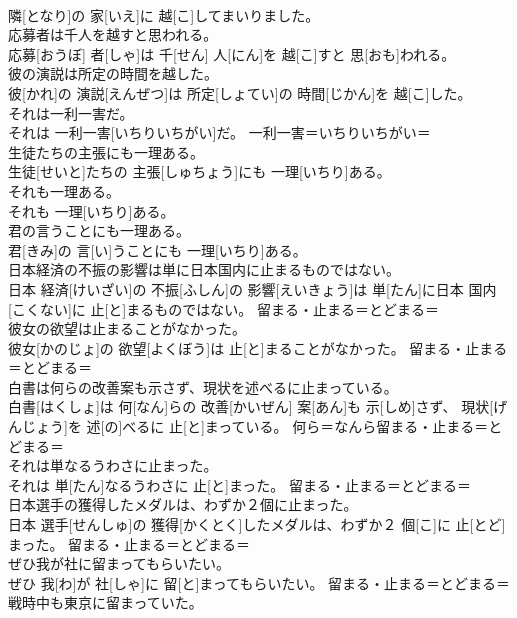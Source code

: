 \documentclass[8pt]{extreport}
\begin{document}
\begin{CJK}{UTF8}{min}
\\	隣[となり]の 家[いえ]に 越[こ]してまいりました。	
\\	応募者は千人を越すと思われる。	
\\	応募[おうぼ] 者[しゃ]は 千[せん] 人[にん]を 越[こ]すと 思[おも]われる。	
\\	彼の演説は所定の時間を越した。	
\\	彼[かれ]の 演説[えんぜつ]は 所定[しょてい]の 時間[じかん]を 越[こ]した。	
\\	それは一利一害だ。	
\\	それは 一利一害[いちりいちがい]だ。	一利一害＝いちりいちがい＝ 
\\	生徒たちの主張にも一理ある。	
\\	生徒[せいと]たちの 主張[しゅちょう]にも 一理[いちり]ある。	
\\	それも一理ある。	
\\	それも 一理[いちり]ある。	
\\	君の言うことにも一理ある。	
\\	君[きみ]の 言[い]うことにも 一理[いちり]ある。	
\\	日本経済の不振の影響は単に日本国内に止まるものではない。	
\\	日本 経済[けいざい]の 不振[ふしん]の 影響[えいきょう]は 単[たん]に日本 国内[こくない]に 止[と]まるものではない。	留まる・止まる＝とどまる＝ 
\\	彼女の欲望は止まることがなかった。	
\\	彼女[かのじょ]の 欲望[よくぼう]は 止[と]まることがなかった。	留まる・止まる＝とどまる＝ 
\\	白書は何らの改善案も示さず、現状を述べるに止まっている。	
\\	白書[はくしょ]は 何[なん]らの 改善[かいぜん] 案[あん]も 示[しめ]さず、 現状[げんじょう]を 述[の]べるに 止[と]まっている。	何ら＝なんら留まる・止まる＝とどまる＝ 
\\	それは単なるうわさに止まった。	
\\	それは 単[たん]なるうわさに 止[と]まった。	留まる・止まる＝とどまる＝ 
\\	日本選手の獲得したメダルは、わずか２個に止まった。	
\\	日本 選手[せんしゅ]の 獲得[かくとく]したメダルは、わずか２ 個[こ]に 止[とど]まった。	留まる・止まる＝とどまる＝ 
\\	ぜひ我が社に留まってもらいたい。	
\\	ぜひ 我[わ]が 社[しゃ]に 留[と]まってもらいたい。	留まる・止まる＝とどまる＝ 
\\	戦時中も東京に留まっていた。	

\end{CJK}
\end{document}
